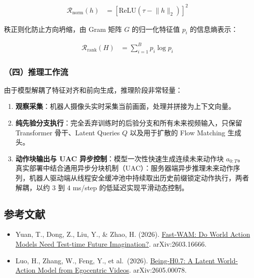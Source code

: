 \[
\begin{aligned}
\mathcal{R}_{\mathrm{norm}}(h)
&=
\left[
\mathrm{ReLU}(\tau - \lVert h\rVert_2)
\right]^2
\end{aligned}
\]

秩正则化防止方向坍缩，由 Gram 矩阵 \(G\) 的归一化特征值 \(p_i\) 的信息熵表示：

\[
\begin{aligned}
\mathcal{R}_{\mathrm{rank}}(H)
&=
\sum_{i=1}^{B} p_i \log p_i
\end{aligned}
\]

\hypertarget{ux56dbux63a8ux7406ux5de5ux4f5cux6d41-1}{%
\subsubsection{（四）推理工作流}\label{ux56dbux63a8ux7406ux5de5ux4f5cux6d41-1}}

由于模型解耦了特征对齐和前向生成，推理阶段非常轻量：

\begin{enumerate}
\def\labelenumi{\arabic{enumi}.}
\tightlist
\item
  \textbf{观察采集}：机器人摄像头实时采集当前画面，处理并拼接为上下文向量。
\item
  \textbf{纯先验分支执行}：完全丢弃训练时的后验分支和所有未来视频输入，只保留 Transformer 骨干、Latent Queries \(Q\) 以及用于扩散的 Flow Matching 生成头。
\item
  \textbf{动作块输出与 UAC 异步控制}：模型一次性快速生成连续未来动作块 \(a_{0:T}\)。真实部署中结合通用异步分块机制（UAC）：服务器端异步推理未来动作序列，机器人驱动端从线程安全缓冲池中持续取出历史前缀锁定动作执行，两者解耦，以约 \(3\) 到 \(4\) ms/step 的低延迟实现平滑动态控制。
\end{enumerate}

\hypertarget{ux53c2ux8003ux6587ux732e-204}{%
\subsection{参考文献}\label{ux53c2ux8003ux6587ux732e-204}}

\begin{itemize}
\tightlist
\item
  Yuan, T., Dong, Z., Liu, Y., \& Zhao, H. (2026). \href{https://arxiv.org/abs/2603.16666}{Fast-WAM: Do World Action Models Need Test-time Future Imagination?}. arXiv:2603.16666.
\item
  Luo, H., Zhang, W., Feng, Y., et al.~(2026). \href{https://arxiv.org/abs/2605.00078}{Being-H0.7: A Latent World-Action Model from Egocentric Videos}. arXiv:2605.00078.
\end{itemize}

\clearpage
